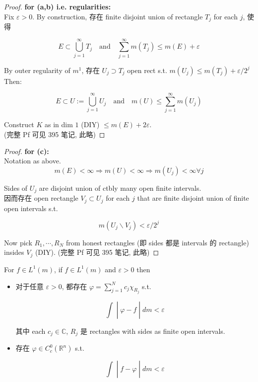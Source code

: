 \begin{proof}

\textbf{for (a,b) i.e. regularities:}\\
Fix \(\varepsilon > 0\). By construction, 存在 finite disjoint union of rectangle \(T_{j}\) for each \(j\), 使得

\[E \subset \bigcup\limits_{j = 1}^{\infty}T_{j}\quad\text{and}\quad\sum\limits_{j = 1}^{\infty}m(T_{j}) \leq m(E) + \varepsilon\]

By outer regularity of \(m^{1}\), 存在 \(U_{j} \supset T_{j}\) open rect s.t. \(m(U_{j}) \leq m(T_{j}) + \varepsilon/2^{j}\) Then:

\[E \subset U := \bigcup\limits_{j = 1}^{\infty}U_{j}\quad\text{and}\quad m(U) \leq \sum\limits_{j = 1}^{\infty}m(U_{j})\]

Construct \(K\) as in dim \(1\) (DIY) \(\leq m(E) + 2\varepsilon\).\\
(完整 Pf 可见 395 笔记, 此略)

\end{proof}

\begin{proof}

\textbf{for (c):}\\
Notation as above.\\

\[m(E) < \infty\Longrightarrow m(U) < \infty\Longrightarrow m(U_{j}) < \infty\forall j\]

Sides of \(U_{j}\) are disjoint union of ctbly many open finite intervals.\\
因而存在 open rectangle \(V_{j} \subset U_{j}\) for each \(j\) that are finite disjoint union of finite open intervals s.t.

\[m(U_{j}\backslash V_{j}) < \varepsilon/2^{j}\]

Now pick \(R_{1},\cdots,R_{N}\) from honest rectangles (即 sides 都是 intervals 的 rectangle) insides \(V_{j}\) (DIY). (完整 Pf 可见 395 笔记, 此略)

\end{proof}

\begin{corollary}

For \(f \in L^{1}(m)\), if \(f \in L^{1}(m)\) and \(\varepsilon > 0\) then

\begin{itemize}
\item
  对于任意 \(\varepsilon > 0\), 都存在 \(\varphi = \sum_{j = 1}^{N}c_{j}\chi_{R_{j}}\) s.t.

  \[\left. \int \middle| \varphi - f \middle| dm < \varepsilon \right.\]

  其中 each \(c_{j} \in \mathbb{C}\), \(R_{j}\) 是 rectangles with sides as finite open intervals.
\item
  存在 \(\varphi \in C_{c}^{0}(\mathbb{R}^{n})\) s.t.

  \[\left. \int \middle| f - \varphi \middle| dm < \varepsilon \right.\]
\end{itemize}

\end{corollary}


